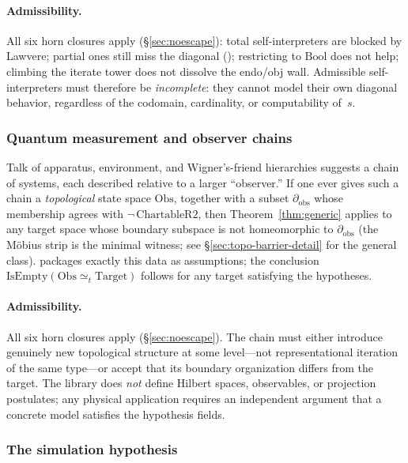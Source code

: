 \documentclass[11pt]{article}
\begin{document}
\paragraph{Admissibility.}
All six horn closures apply (\S\ref{sec:noescape}): total
self-interpreters are blocked by Lawvere; partial ones still miss the
diagonal (); restricting
to $\mathrm{Bool}$ does not help; climbing the iterate tower does
not dissolve the endo/obj wall.  Admissible self-interpreters must
therefore be \emph{incomplete}: they cannot model their own diagonal
behavior, regardless of the codomain, cardinality, or computability
of~$s$.

\subsubsection{Quantum measurement and observer chains}

Talk of apparatus, environment, and Wigner's-friend hierarchies suggests a chain of
systems, each described relative to a larger ``observer.'' If one ever gives such
a chain a \emph{topological} state space $\mathrm{Obs}$, together with a subset
$\partial_{\mathrm{obs}}$ whose membership agrees with
$\neg\,\mathrm{ChartableR2}$, then Theorem~\ref{thm:generic} applies to any
target space whose boundary subspace is not homeomorphic to
$\partial_{\mathrm{obs}}$ (the M\"obius strip is the minimal witness;
see \S\ref{sec:topo-barrier-detail} for the general class).
 packages exactly this data as
assumptions; the conclusion
$\mathrm{IsEmpty}(\mathrm{Obs} \simeq_t \mathrm{Target})$ follows for
any target satisfying the hypotheses.

\paragraph{Admissibility.}
All six horn closures apply (\S\ref{sec:noescape}).  The chain must
either introduce genuinely new topological structure at some
level---not representational iteration of the same type---or accept
that its boundary organization differs from the target.  The library
does \emph{not} define Hilbert spaces, observables, or projection
postulates; any physical application requires an independent argument
that a concrete model satisfies the hypothesis fields.

\subsubsection{The simulation hypothesis}
\label{sec:simulation}
\end{document}
